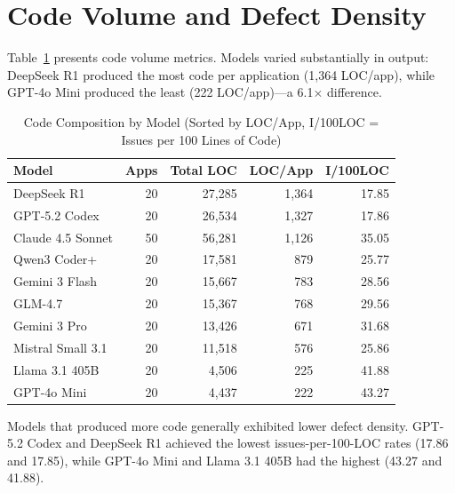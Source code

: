 \section{Code Volume and Defect Density}
\label{sec:code_volume}

Table~\ref{tab:code_composition} presents code volume metrics. Models varied substantially in output: DeepSeek R1 produced the most code per application (1{,}364 LOC/app), while GPT-4o Mini produced the least (222 LOC/app)---a 6.1$\times$ difference.

\begin{table}[htbp]
    \centering
    \caption{Code Composition by Model (Sorted by LOC/App, I/100LOC = Issues per 100 Lines of Code)}
    \label{tab:code_composition}
    \small
    \begin{tabular}{@{} l r r r r @{}}
        \toprule
        \textbf{Model} & \textbf{Apps} & \textbf{Total LOC} & \textbf{LOC/App} & \textbf{I/100LOC} \\
        \midrule
        DeepSeek R1 & 20 & 27{,}285 & 1{,}364 & 17.85 \\
        GPT-5.2 Codex & 20 & 26{,}534 & 1{,}327 & 17.86 \\
        Claude 4.5 Sonnet & 50 & 56{,}281 & 1{,}126 & 35.05 \\
        Qwen3 Coder+ & 20 & 17{,}581 & 879 & 25.77 \\
        Gemini 3 Flash & 20 & 15{,}667 & 783 & 28.56 \\
        GLM-4.7 & 20 & 15{,}367 & 768 & 29.56 \\
        Gemini 3 Pro & 20 & 13{,}426 & 671 & 31.68 \\
        Mistral Small 3.1 & 20 & 11{,}518 & 576 & 25.86 \\
        Llama 3.1 405B & 20 & 4{,}506 & 225 & 41.88 \\
        GPT-4o Mini & 20 & 4{,}437 & 222 & 43.27 \\
        \bottomrule
    \end{tabular}
\end{table}

Models that produced more code generally exhibited lower defect density. GPT-5.2 Codex and DeepSeek R1 achieved the lowest issues-per-100-LOC rates (17.86 and 17.85), while GPT-4o Mini and Llama 3.1 405B had the highest (43.27 and 41.88).

